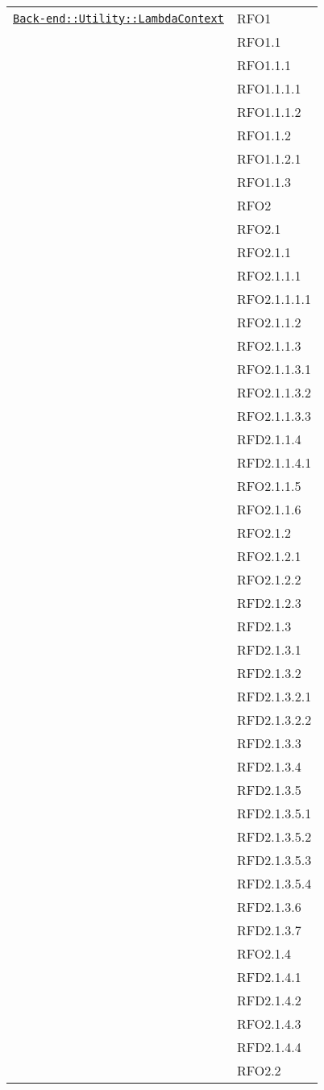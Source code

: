 \begin{longtable}{|>{\centering}m{10cm}|m{3cm}<{\centering}|}
\hyperref[Back-end::Utility::LambdaContext]{\texttt{Back-end::Utility::LambdaContext}} & RFO1\\
& RFO1.1\\
& RFO1.1.1\\
& RFO1.1.1.1\\
& RFO1.1.1.2\\
& RFO1.1.2\\
& RFO1.1.2.1\\
& RFO1.1.3\\
& RFO2\\
& RFO2.1\\
& RFO2.1.1\\
& RFO2.1.1.1\\
& RFO2.1.1.1.1\\
& RFO2.1.1.2\\
& RFO2.1.1.3\\
& RFO2.1.1.3.1\\
& RFO2.1.1.3.2\\
& RFO2.1.1.3.3\\
& RFD2.1.1.4\\
& RFD2.1.1.4.1\\
& RFO2.1.1.5\\
& RFO2.1.1.6\\
& RFO2.1.2\\
& RFO2.1.2.1\\
& RFO2.1.2.2\\
& RFD2.1.2.3\\
& RFD2.1.3\\
& RFD2.1.3.1\\
& RFD2.1.3.2\\
& RFD2.1.3.2.1\\
& RFD2.1.3.2.2\\
& RFD2.1.3.3\\
& RFD2.1.3.4\\
& RFD2.1.3.5\\
& RFD2.1.3.5.1\\
& RFD2.1.3.5.2\\
& RFD2.1.3.5.3\\
& RFD2.1.3.5.4\\
& RFD2.1.3.6\\
& RFD2.1.3.7\\
& RFO2.1.4\\
& RFD2.1.4.1\\
& RFD2.1.4.2\\
& RFO2.1.4.3\\
& RFD2.1.4.4\\
& RFO2.2\\

\end{longtable}
